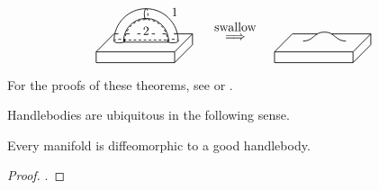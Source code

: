 \[ \begin{tikzpicture}[line width=.6]
    \tikzstyle{dp}=[dash pattern=on 2pt off 2pt]
    
    \draw (-.88,.2) -- (-.9,.2) -- (-1.4,-.3) -- (-1.4,-.6) -- (.8,-.6) -- (1.3,-.1) -- (1.3,.2) -- (.88,.2)
          (-1.4,-.3) -- (.8,-.3) -- (1.3,.2)
          (.8,-.3) -- (.8,-.6)
          (-.63,-.03) -- (.63,-.03);
    \draw[loosely dashed] (.88,.2) -- (0,.2) (-.88,.2) -- (0,.2);
    \draw[dp] (-.63,.03) -- (.63,.03);

    \draw[dp] (-.9,0) arc (180 : 0 : .15 and .05);
    \draw (-.9,0) arc (180 : 360 : .15 and .05);
    \draw[dp] (.6,0) arc (180 : 0 : .15 and .05);
    \draw (.6,0) arc (180 : 360 : .15 and .05);
    \draw[dp] (0,.9) arc (90 : -90 : .05 and .15);
    \draw (0,.9) arc (90 : 270 : .05 and .15);
    \draw (-.9,0) arc (180 : 0 : .9);
    \draw[dp] (-.6,0) arc (180 : 0 : .6);
    \draw (0,.63) arc (90 : -2 : .63);
    \draw (0,.63) arc (90 : 182 : .63);

    \node at (.8,.8) {1};
    \node[fill=white, inner xsep=2pt] at (0,.28) {2};

    \node at (2.5,.1) {\text{$\Longrightarrow$}};
    \node at (2.5,.4) {\text{swallow}};
    
    \draw (4.8,.2) -- (4.1,.2) -- (3.6,-.3) -- (3.6,-.6) -- (5.8,-.6) -- (6.3,-.1) -- (6.3,.2) -- (5.2,.2)
          (3.6,-.3) -- (5.8,-.3) -- (6.3,.2)
          (5.8,-.3) -- (5.8,-.6);
    \draw (4.4,0) .. controls (4.7,0) and (4.7,.25) .. (5,.25)
                  .. controls (5.3,.25) and (5.3,0) .. (5.6,0);
\end{tikzpicture} \]

For the proofs of these theorems,
see \cite{matsu} or \cite{milnor2}.
\medskip

Handlebodies are ubiquitous in the following sense.

\begin{theorem}\label{cor:handle-decomp}
    Every manifold is diffeomorphic to a good handlebody.
\end{theorem}

\begin{proof}
    \cite[Corollary~5.2.2]{wall}.
\end{proof}

